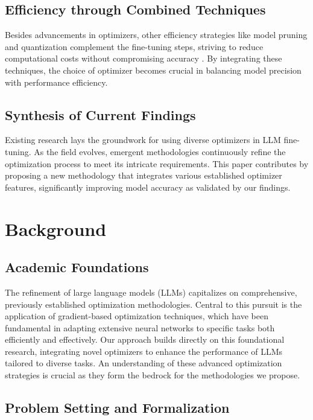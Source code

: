 \documentclass{article} %
\begin{document}
\subsection{Efficiency through Combined Techniques}
Besides advancements in optimizers, other efficiency strategies like model pruning and quantization complement the fine-tuning steps, striving to reduce computational costs without compromising accuracy \cite{efficientModels2021}. By integrating these techniques, the choice of optimizer becomes crucial in balancing model precision with performance efficiency.

\subsection{Synthesis of Current Findings}
Existing research lays the groundwork for using diverse optimizers in LLM fine-tuning. As the field evolves, emergent methodologies continuously refine the optimization process to meet its intricate requirements. This paper contributes by proposing a new methodology that integrates various established optimizer features, significantly improving model accuracy as validated by our findings.

\section{Background}
\label{sec:background}
\subsection{Academic Foundations}

The refinement of large language models (LLMs) capitalizes on comprehensive, previously established optimization methodologies. Central to this pursuit is the application of gradient-based optimization techniques, which have been fundamental in adapting extensive neural networks to specific tasks both efficiently and effectively. Our approach builds directly on this foundational research, integrating novel optimizers to enhance the performance of LLMs tailored to diverse tasks. An understanding of these advanced optimization strategies is crucial as they form the bedrock for the methodologies we propose.

\subsection{Problem Setting and Formalization}
\end{document}
